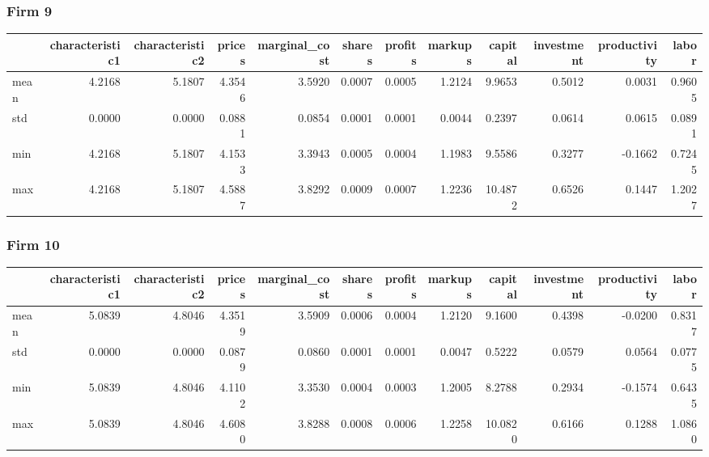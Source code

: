  \subsubsection*{Firm 9}
\begin{tabular}{lrrrrrrrrrrr}
\toprule
{} &  characteristic1 &  characteristic2 &  prices &  marginal\_cost &  shares &  profits &  markups &  capital &  investment &  productivity &  labor \\
\midrule
mean &           4.2168 &           5.1807 &  4.3546 &         3.5920 &  0.0007 &   0.0005 &   1.2124 &   9.9653 &      0.5012 &        0.0031 & 0.9605 \\
std  &           0.0000 &           0.0000 &  0.0881 &         0.0854 &  0.0001 &   0.0001 &   0.0044 &   0.2397 &      0.0614 &        0.0615 & 0.0891 \\
min  &           4.2168 &           5.1807 &  4.1533 &         3.3943 &  0.0005 &   0.0004 &   1.1983 &   9.5586 &      0.3277 &       -0.1662 & 0.7245 \\
max  &           4.2168 &           5.1807 &  4.5887 &         3.8292 &  0.0009 &   0.0007 &   1.2236 &  10.4872 &      0.6526 &        0.1447 & 1.2027 \\
\bottomrule
\end{tabular}


 \subsubsection*{Firm 10}
\begin{tabular}{lrrrrrrrrrrr}
\toprule
{} &  characteristic1 &  characteristic2 &  prices &  marginal\_cost &  shares &  profits &  markups &  capital &  investment &  productivity &  labor \\
\midrule
mean &           5.0839 &           4.8046 &  4.3519 &         3.5909 &  0.0006 &   0.0004 &   1.2120 &   9.1600 &      0.4398 &       -0.0200 & 0.8317 \\
std  &           0.0000 &           0.0000 &  0.0879 &         0.0860 &  0.0001 &   0.0001 &   0.0047 &   0.5222 &      0.0579 &        0.0564 & 0.0775 \\
min  &           5.0839 &           4.8046 &  4.1102 &         3.3530 &  0.0004 &   0.0003 &   1.2005 &   8.2788 &      0.2934 &       -0.1574 & 0.6435 \\
max  &           5.0839 &           4.8046 &  4.6080 &         3.8288 &  0.0008 &   0.0006 &   1.2258 &  10.0820 &      0.6166 &        0.1288 & 1.0860 \\
\bottomrule
\end{tabular}


